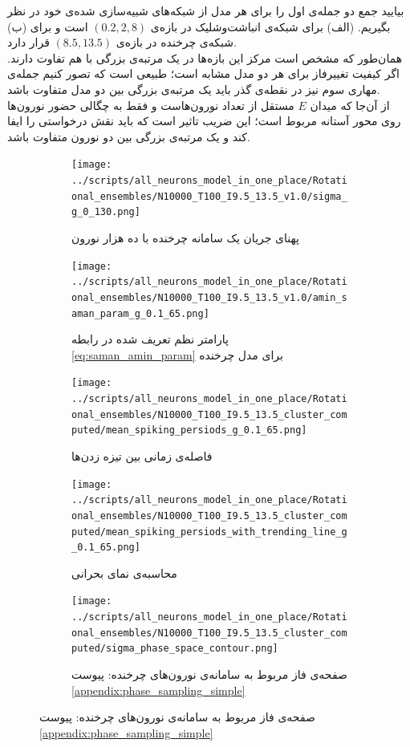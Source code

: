بیایید جمع دو جمله‌ی اول را برای هر مدل از شبکه‌های شبیه‌سازی شده‌ی خود در نظر بگیریم. (الف) برای شبکه‌ی انباشت‌وشلیک در بازه‌ی 
$(0.2, 2,8)$
است و برای (ب) شبکه‌ی چرخنده در بازه‌ی
$(8.5, 13.5)$
قرار دارد.\\
 همان‌طور که مشخص است مرکز این بازه‌ها در یک مرتبه‌ی بزرگی با هم تفاوت دارند. اگر کیفیت تغییرفاز برای هر دو مدل مشابه است؛ طبیعی است که تصور کنیم جمله‌ی مهاری سوم نیز در نقطه‌ی گذر باید  یک مرتبه‌ی بزرگی بین دو مدل متفاوت باشد.\\
 از آن‌جا که میدان
 $E$
 مستقل از تعداد نورون‌هاست و فقط به چگالی حضور نورون‌ها روی محور آستانه مربوط است؛ این ضریب تاثیر است که باید نقش درخواستی را ایفا کند و یک مرتبه‌ی بزرگی بین دو نورون متفاوت باشد.
\begin{figure}
	\begin{subfigure}[b]{0.5\textwidth}
	\centering
	\texttt{[image: ../scripts/all\_neurons\_model\_in\_one\_place/Rotational\_ensembles/N10000\_T100\_I9.5\_13.5\_v1.0/sigma\_g\_0\_130.png]}
	\caption{پهنای جریان یک سامانه چرخنده با ده هزار نورون}
	\label{fig:sigma_rotational}
	\end{subfigure}
	\hfill
	\begin{subfigure}[b]{0.5\textwidth}
		\centering
		\texttt{[image: ../scripts/all\_neurons\_model\_in\_one\_place/Rotational\_ensembles/N10000\_T100\_I9.5\_13.5\_v1.0/amin\_saman\_param\_g\_0.1\_65.png]}
		\caption{پارامتر نظم تعریف شده در رابطه \ref{eq:saman_amin_param} برای مدل چرخنده }
		\label{fig:amin_saman_rotational}
	\end{subfigure}
	\hfil
	\begin{subfigure}[b]{0.5\textwidth}
		\centering
		\texttt{[image: ../scripts/all\_neurons\_model\_in\_one\_place/Rotational\_ensembles/N10000\_T100\_I9.5\_13.5\_cluster\_computed/mean\_spiking\_persiods\_g\_0.1\_65.png]}
		\caption{فاصله‌ی زمانی بین تیزه زدن‌ها}
		\label{fig:interspikes_rotational}
	\end{subfigure}
	\hfill
	\begin{subfigure}[b]{0.5\textwidth}
		\centering
		\texttt{[image: ../scripts/all\_neurons\_model\_in\_one\_place/Rotational\_ensembles/N10000\_T100\_I9.5\_13.5\_cluster\_computed/mean\_spiking\_persiods\_with\_trending\_line\_g\_0.1\_65.png]}
		\caption{محاسبه‌ی نمای بحرانی}
		\label{fig:interspikes_rotational_trending_line}
	\end{subfigure}
	\hfill
	\begin{subfigure}[b]{0.5\textwidth}
		\centering
		\texttt{[image: ../scripts/all\_neurons\_model\_in\_one\_place/Rotational\_ensembles/N10000\_T100\_I9.5\_13.5\_cluster\_computed/sigma\_phase\_space\_contour.png]}
		\caption{صفحه‌ی فاز مربوط به سامانه‌ی نورون‌های چرخنده: پیوست \ref{appendix:phase_sampling_simple}}
		\label{fig:rot_g_d_phase_space}
	\end{subfigure}
\end{figure}




